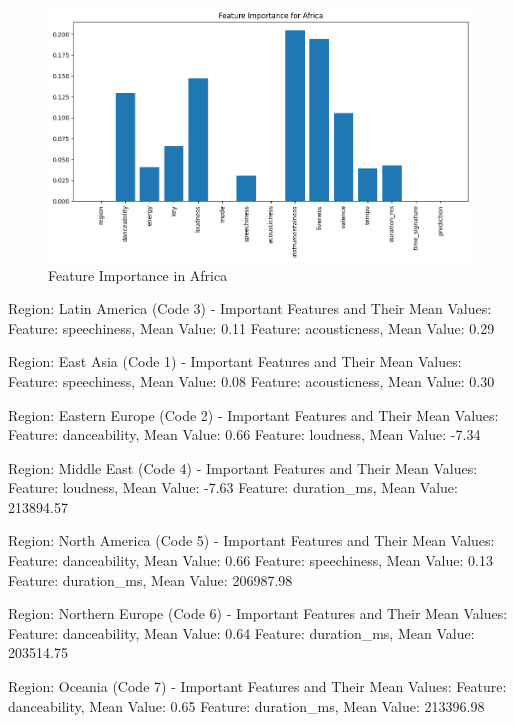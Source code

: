 \begin{figure}[h]
    \centering
    \begin{minipage}{0.45\textwidth}
        \centering
        \includegraphics[width=\linewidth]{media/dt_feat_imp_afr.png}
        \caption{Feature Importance in Africa}
    \end{minipage}
\end{figure}


Region: Latin America (Code 3) - Important Features and Their Mean Values:
Feature: speechiness, Mean Value: 0.11
Feature: acousticness, Mean Value: 0.29

Region: East Asia (Code 1) - Important Features and Their Mean Values:
Feature: speechiness, Mean Value: 0.08
Feature: acousticness, Mean Value: 0.30

Region: Eastern Europe (Code 2) - Important Features and Their Mean Values:
Feature: danceability, Mean Value: 0.66
Feature: loudness, Mean Value: -7.34

Region: Middle East (Code 4) - Important Features and Their Mean Values:
Feature: loudness, Mean Value: -7.63
Feature: duration\_ms, Mean Value: 213894.57

Region: North America (Code 5) - Important Features and Their Mean Values:
Feature: danceability, Mean Value: 0.66
Feature: speechiness, Mean Value: 0.13
Feature: duration\_ms, Mean Value: 206987.98

Region: Northern Europe (Code 6) - Important Features and Their Mean Values:
Feature: danceability, Mean Value: 0.64
Feature: duration\_ms, Mean Value: 203514.75

Region: Oceania (Code 7) - Important Features and Their Mean Values:
Feature: danceability, Mean Value: 0.65
Feature: duration\_ms, Mean Value: 213396.98

